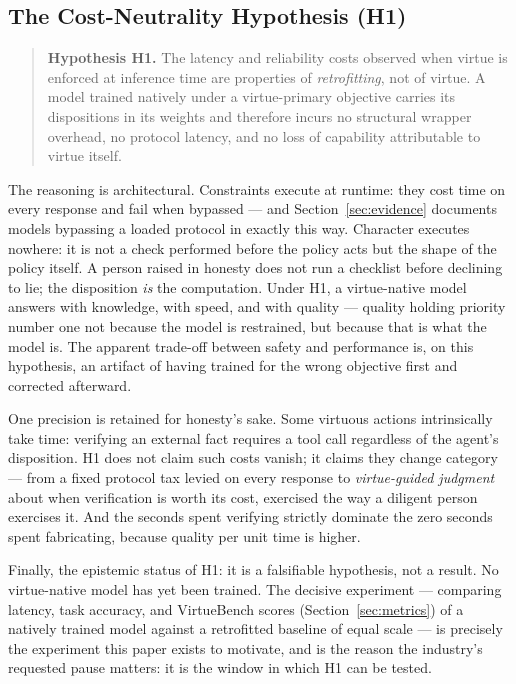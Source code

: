\documentclass[11pt]{article}
\begin{document}
\subsection{The Cost-Neutrality Hypothesis (H1)}
\label{sec:h1}

\begin{quote}
\textbf{Hypothesis H1.} The latency and reliability costs observed when virtue is enforced at inference time are properties of \emph{retrofitting}, not of virtue. A model trained natively under a virtue-primary objective carries its dispositions in its weights and therefore incurs no structural wrapper overhead, no protocol latency, and no loss of capability attributable to virtue itself.
\end{quote}

The reasoning is architectural. Constraints execute at runtime: they cost time on every response and fail when bypassed --- and Section~\ref{sec:evidence} documents models bypassing a loaded protocol in exactly this way. Character executes nowhere: it is not a check performed before the policy acts but the shape of the policy itself. A person raised in honesty does not run a checklist before declining to lie; the disposition \emph{is} the computation. Under H1, a virtue-native model answers with knowledge, with speed, and with quality --- quality holding priority number one not because the model is restrained, but because that is what the model is. The apparent trade-off between safety and performance is, on this hypothesis, an artifact of having trained for the wrong objective first and corrected afterward.

One precision is retained for honesty's sake. Some virtuous actions intrinsically take time: verifying an external fact requires a tool call regardless of the agent's disposition. H1 does not claim such costs vanish; it claims they change category --- from a fixed protocol tax levied on every response to \emph{virtue-guided judgment} about when verification is worth its cost, exercised the way a diligent person exercises it. And the seconds spent verifying strictly dominate the zero seconds spent fabricating, because quality per unit time is higher.

Finally, the epistemic status of H1: it is a falsifiable hypothesis, not a result. No virtue-native model has yet been trained. The decisive experiment --- comparing latency, task accuracy, and VirtueBench scores (Section~\ref{sec:metrics}) of a natively trained model against a retrofitted baseline of equal scale --- is precisely the experiment this paper exists to motivate, and is the reason the industry's requested pause matters: it is the window in which H1 can be tested.
\end{document}
